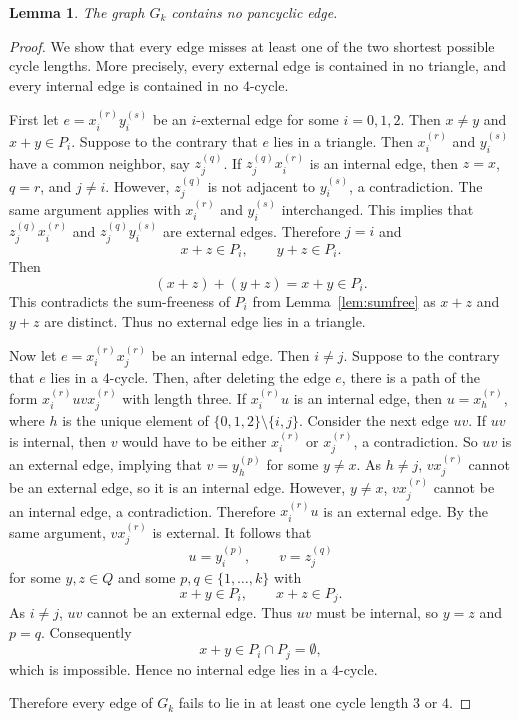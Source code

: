 \documentclass[12pt]{article}
\newtheorem{lemma}{Lemma}
\begin{document}
\begin{lemma}\label{lem:no-pancyclic-edge}
The graph $G_k$ contains no pancyclic edge.
\end{lemma}

\begin{proof}
We show that every edge misses at least one of the two shortest possible cycle lengths. More precisely, every external edge is contained in no triangle, and every internal edge is contained in no $4$-cycle.

First let $e=x_i^{(r)}y_i^{(s)}$ 
be an $i$-external edge for some $i=0,1,2$. Then $x\ne y$ and $x+y\in P_i$. Suppose to the contrary that $e$ lies in a triangle. Then $x_i^{(r)}$ and $y_i^{(s)}$ have a common neighbor, say $z_j^{(q)}$.
If $z_j^{(q)}x_i^{(r)}$ is an internal edge, then $z=x$, $q=r$, and $j\ne i$. However, $z_j^{(q)}$ is not adjacent to $y_i^{(s)}$, a contradiction. The same argument applies with $x_i^{(r)}$ and $y_i^{(s)}$ interchanged. 
This implies that $z_j^{(q)}x_i^{(r)}$ and  $z_j^{(q)}y_i^{(s)}$ are external edges.
Therefore $j=i$ and
\[
x+z\in P_i,\qquad y+z\in P_i.
\]
Then
\[
(x+z)+(y+z)=x+y\in P_i.
\]
This contradicts the sum-freeness of $P_i$ from Lemma~\ref{lem:sumfree} 
as $x+z$ and $y+z$ are distinct. Thus no external edge lies in a triangle.

Now let $e=x_i^{(r)}x_j^{(r)}$
be an internal edge. Then $i\ne j$. Suppose to the contrary that $e$ lies in a $4$-cycle. Then, after deleting the edge $e$, there is a path of the form  $x_i^{(r)}uvx_j^{(r)}$ with length three.  %
If $x_i^{(r)}u$ is an internal edge, then $u=x_h^{(r)}$, where $h$ is the unique element of $\{0,1,2\}\setminus\{i,j\}$. Consider the next edge $uv$. If $uv$ is internal, then $v$ would have to be either $x_i^{(r)}$ or $x_j^{(r)}$, a contradiction. So $uv$ is an external edge, implying that $v=y_h^{(p)}$ for some $y\ne x$. As $h\ne j$, $vx_j^{(r)}$ cannot be an external edge,  so it is an internal edge. However, $y\ne x$, $vx_j^{(r)}$ cannot be an internal edge, a contradiction. Therefore $x_i^{(r)}u$ is an external edge. By the same argument, $vx_j^{(r)}$ is external.
It follows that
\[
u=y_i^{(p)},\qquad v=z_j^{(q)}
\]
for some $y,z\in Q$ and some $p,q\in \{1,\dots,k\}$ with
\[
x+y\in P_i,
\qquad
x+z\in P_j.
\]
As $i\ne j$, $uv$ cannot be an external edge. Thus $uv$ must be internal, so $y=z$ and $p=q$. Consequently
\[
x+y\in P_i\cap P_j=\emptyset,
\]
which is impossible. Hence no internal edge lies in a $4$-cycle.

Therefore every edge of $G_k$ fails to lie in at least one cycle length $3$ or $4$. %
\end{proof}
\end{document}
